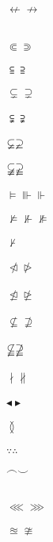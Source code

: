 \documentclass{article}
\begin{document}
$\nleftarrow \nrightarrow$\\\\
\\
$\Subset \Supset$\\\\
$\subseteqq \supseteqq$\\\\
$\subsetneq \supsetneq$\\\\
$\subsetneqq \supsetneqq$\\\\
$\varsubsetneq \varsupsetneq$\\\\       
$\varsubsetneqq \varsupsetneqq$\\\\
$\vDash \Vvdash \Vdash$\\\\
$\nvDash \nVdash \nVDash$\\\\
$\nvdash$\\\\
$\ntriangleleft \ntriangleright$\\\\
$\ntrianglelefteq \ntrianglerighteq$\\\\
$\nsubseteq \nsupseteq$\\\\
$\nsubseteqq \nsupseteqq$\\\\
$\nmid \nparallel$\\\\
$\blacktriangleleft \blacktriangleright$\\\\
$\between$\\\\
$\because \therefore$\\\\
$\smallfrown \smallsmile$\\\\
\\
$\lll \ggg$\\\\
$\approxeq \ncong $\\\\
\end{document}
